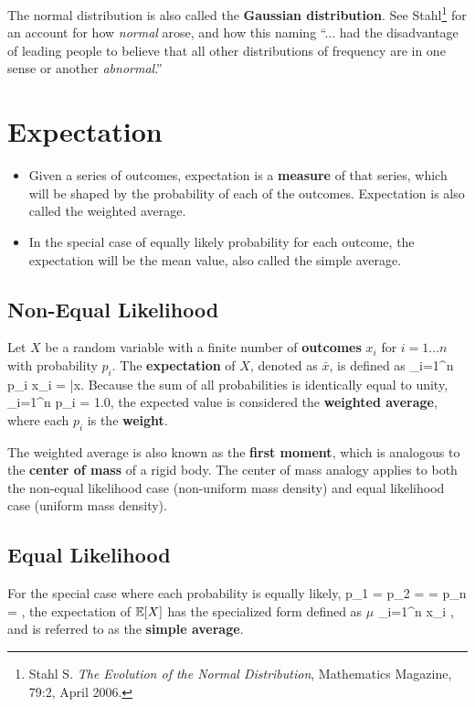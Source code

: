 \begin{Hremark}
The 
normal distribution is also called the {\bf Gaussian
distribution}.  See 
Stahl\footnote{Stahl S. {\em The Evolution of the Normal
Distribution}, Mathematics Magazine, 79:2, April 2006.} 
for an account for 
how {\em normal} arose, and how this naming 
``... had the disadvantage of leading people to believe
that all other distributions of frequency are in one sense
or another {\em abnormal}.''
\end{Hremark}

\section{Expectation}

\begin{itemize}
\item Given a series of outcomes, expectation 
is a {\bf measure} of that series, which will 
be shaped by the probability of each of the outcomes.  
Expectation is also called the weighted average.
\item In the 
special case of equally likely probability for each outcome, 
the expectation will be the mean value, also called the 
simple average.
\end{itemize}

\subsection{Non-Equal Likelihood}

Let $X$ be a random variable with a finite number of 
{\bf outcomes} $x_i$
for $i=1\ldots n$ with probability $p_i$.  The {\bf expectation} 
of $X$, denoted as $\bar{x}$, is defined as
\be
\ex {} \sum_{i=1}^n \; p_i \; x_i = \bar{x}.
\label{eq:simple_average}
\ee
Because the sum of all probabilities is identically 
equal to unity,
\be
\sum_{i=1}^n \; p_i = 1.0,
\ee
the expected
value is considered the 
{\bf weighted average}, where each $p_i$ is the 
{\bf weight}.

\begin{Hremark}
The weighted average is also 
known as the {\bf first moment}, which is 
analogous to the {\bf center of mass} of a rigid body.
The center of mass analogy applies to both the non-equal
likelihood case (non-uniform mass density) and equal
likelihood case (uniform mass density).
\end{Hremark}

\subsection{Equal Likelihood}
For the special case where each probability is equally likely, 
\be
p_1 = p_2 = \cdots = p_n = ,
\label{eq:equal_probability}
\ee
the expectation of $\mathbb{E}[X]$ has the specialized form 
defined as $\mu$ 
\be
\ex \overset{(\ref{eq:equal_probability})}{=} 
 \sum_{i=1}^n \; x_i
 \mu,
\label{eq:simple_average}
\ee
and is referred to as the {\bf simple average}.

